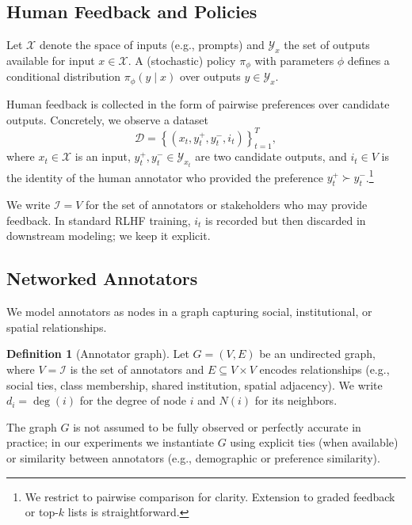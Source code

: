\documentclass{article}
\theoremstyle{plain}
\theoremstyle{definition}
\newtheorem{definition}[theorem]{Definition}
\theoremstyle{remark}
\begin{document}
\subsection{Human Feedback and Policies}

Let $\mathcal{X}$ denote the space of inputs (e.g., prompts) and $\mathcal{Y}_x$
the set of outputs available for input $x \in \mathcal{X}$. A (stochastic)
policy $\pi_\phi$ with parameters $\phi$ defines a conditional distribution
$\pi_\phi(y \mid x)$ over outputs $y \in \mathcal{Y}_x$.

Human feedback is collected in the form of pairwise preferences over candidate
outputs. Concretely, we observe a dataset
\begin{equation}
    \mathcal{D}
    =
    \left\{ (x_t, y_t^+, y_t^-, i_t) \right\}_{t=1}^T,
\end{equation}
where $x_t \in \mathcal{X}$ is an input, $y_t^+, y_t^- \in \mathcal{Y}_{x_t}$ are
two candidate outputs, and $i_t \in V$ is the identity of the human annotator
who provided the preference $y_t^+ \succ y_t^-$.\footnote{We restrict to
pairwise comparison for clarity. Extension to graded feedback or top-$k$ lists
is straightforward.}

We write $\mathcal{I} = V$ for the set of annotators or stakeholders who may
provide feedback. In standard RLHF training, $i_t$ is recorded but then
discarded in downstream modeling; we keep it explicit.

\subsection{Networked Annotators}
\label{subsec:networked-annotators}

We model annotators as nodes in a graph capturing social, institutional, or
spatial relationships.

\begin{definition}[Annotator graph]
Let $G = (V, E)$ be an undirected graph, where $V = \mathcal{I}$ is the set of
annotators and $E \subseteq V \times V$ encodes relationships (e.g., social
ties, class membership, shared institution, spatial adjacency). We write
$d_i = \deg(i)$ for the degree of node $i$ and $N(i)$ for its neighbors.
\end{definition}

The graph $G$ is not assumed to be fully observed or perfectly accurate in
practice; in our experiments we instantiate $G$ using explicit
ties (when available) or similarity between annotators (e.g., demographic or
preference similarity).
\end{document}
